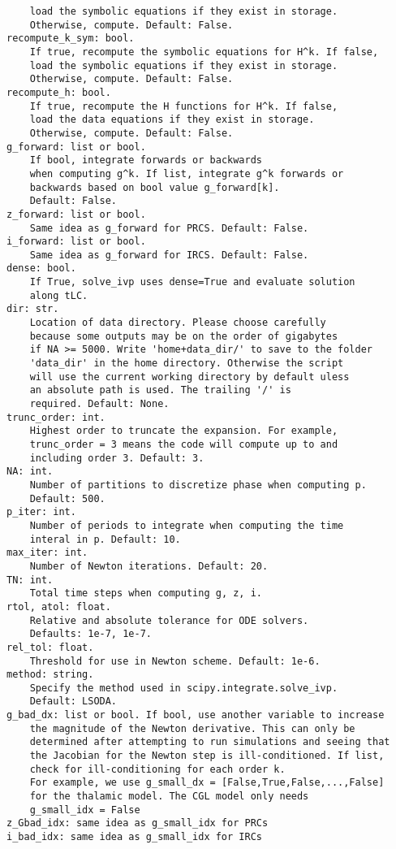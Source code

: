 \documentclass[english,a4paper,oneside]{article}
\begin{document}
\begin{verbatim}
    load the symbolic equations if they exist in storage.
    Otherwise, compute. Default: False.
recompute_k_sym: bool.
    If true, recompute the symbolic equations for H^k. If false,
    load the symbolic equations if they exist in storage.
    Otherwise, compute. Default: False.
recompute_h: bool.
    If true, recompute the H functions for H^k. If false,
    load the data equations if they exist in storage.
    Otherwise, compute. Default: False.
g_forward: list or bool.
    If bool, integrate forwards or backwards
    when computing g^k. If list, integrate g^k forwards or
    backwards based on bool value g_forward[k].
    Default: False.
z_forward: list or bool.
    Same idea as g_forward for PRCS. Default: False.
i_forward: list or bool.
    Same idea as g_forward for IRCS. Default: False.
dense: bool.
    If True, solve_ivp uses dense=True and evaluate solution
    along tLC.
dir: str.
    Location of data directory. Please choose carefully
    because some outputs may be on the order of gigabytes
    if NA >= 5000. Write 'home+data_dir/' to save to the folder
    'data_dir' in the home directory. Otherwise the script
    will use the current working directory by default uless
    an absolute path is used. The trailing '/' is
    required. Default: None.
trunc_order: int.
    Highest order to truncate the expansion. For example, 
    trunc_order = 3 means the code will compute up to and 
    including order 3. Default: 3.
NA: int.
    Number of partitions to discretize phase when computing p.
    Default: 500.
p_iter: int.
    Number of periods to integrate when computing the time 
    interal in p. Default: 10.
max_iter: int.
    Number of Newton iterations. Default: 20.
TN: int.
    Total time steps when computing g, z, i.
rtol, atol: float.
    Relative and absolute tolerance for ODE solvers.
    Defaults: 1e-7, 1e-7.
rel_tol: float.
    Threshold for use in Newton scheme. Default: 1e-6.
method: string.
    Specify the method used in scipy.integrate.solve_ivp.
    Default: LSODA.
g_bad_dx: list or bool. If bool, use another variable to increase
    the magnitude of the Newton derivative. This can only be
    determined after attempting to run simulations and seeing that
    the Jacobian for the Newton step is ill-conditioned. If list,
    check for ill-conditioning for each order k.
    For example, we use g_small_dx = [False,True,False,...,False]
    for the thalamic model. The CGL model only needs
    g_small_idx = False
z_Gbad_idx: same idea as g_small_idx for PRCs
i_bad_idx: same idea as g_small_idx for IRCs
\end{verbatim}
\end{document}
